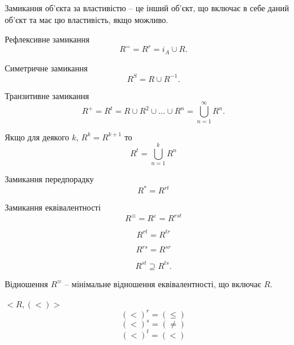 \begin{definition}[Замикання]
    Замикання об'єкта за властивістю -- це
    інший об'єкт, що включає в себе даний об'єкт та
    має цю властивість, якщо можливо.
\end{definition}

\begin{definition}
    Рефлексивне замикання
    $$R^= = R^r = i_A \cup R.$$
\end{definition}

\begin{definition}
    Симетричне замикання
    $$R^S = R \cup R^{-1}.$$
\end{definition}

\begin{definition}
    Транзитивне замикання
    $$R^+ = R^t = R \cup R^2 \cup ... \cup R^n = \bigcup\limits_{n=1}^{\infty} R^n.$$
\end{definition}

\begin{remark}
    Якщо для деякого $k$, $R^k = R^{k+1}$ то
    $$R^t = \bigcup\limits_{n=1}^{k} R^n$$
\end{remark}

\begin{definition}
    Замикання передпорадку
    $$R^*= R^{rt}$$
\end{definition}

\begin{definition}
    Замикання еквівалентності
    $$R^{\equiv} = R^{\varepsilon} = R^{rst}$$
\end{definition}

\begin{claim}
    $$R^{rt} = R^{tr}$$
\end{claim}

\begin{claim}
    $$R^{rs} = R^{sr}$$
\end{claim}

\begin{claim}
    $$R^{st} \supseteq R^{ts}.$$
\end{claim}

\begin{claim}
    Відношення $R^{\equiv}$ -- мінімальне відношення еквівалентності,
    що включає $R$.
\end{claim}

\begin{example}
    $<R, (<)>$
    $$(<)^{r} = (\leqslant)$$
    $$(<)^{s} = (\neq)$$
    $$(<)^{t} = (<)$$
\end{example}

